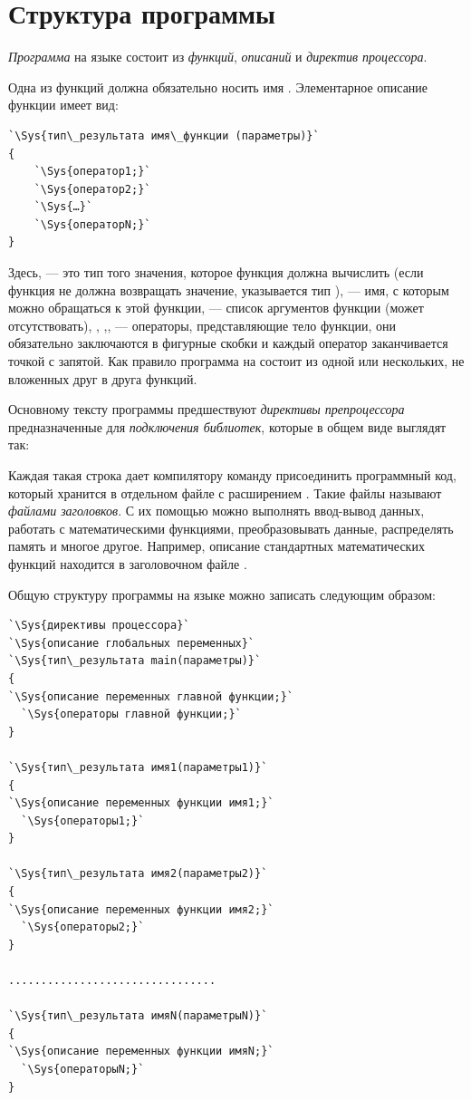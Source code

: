 \noindent{}

\section[Структура программы]{Структура программы}
\emph{Программа} на языке  состоит из
\emph{функций}, \emph{описаний} и \emph{директив процессора}. 

Одна из функций должна обязательно носить имя . Элементарное описание функции имеет вид:

\begin{lstlisting}
`\Sys{тип\_результата имя\_функции (параметры)}`
{
    `\Sys{оператор1;}`
    `\Sys{оператор2;}`
    `\Sys{…}`
    `\Sys{операторN;}`
}
\end{lstlisting}

Здесь,  --- это тип того значения, которое функция должна вычислить (если функция не
должна возвращать значение, указывается тип ),  --- имя, с которым
можно обращаться к этой функции,  --- список аргументов функции (может отсутствовать),
, ,,  --- операторы, представляющие
тело функции, они обязательно заключаются в фигурные скобки и каждый оператор заканчивается точкой с запятой. Как
правило программа на  состоит из одной или нескольких, не вложенных друг в друга функций.

Основному тексту программы предшествуют \emph{директивы препроцессора}
предназначенные для \emph{подключения библиотек}, которые в общем виде
выглядят так:


Каждая такая строка дает компилятору команду присоединить программный код, который хранится в отдельном файле с
расширением . Такие файлы называют \emph{файлами заголовков}. С их помощью можно
выполнять ввод-вывод данных, работать с математическими функциями, преобразовывать данные, распределять память и многое
другое. Например, описание стандартных математических функций находится в заголовочном файле .

Общую структуру программы на языке  можно записать следующим образом:
\begin{lstlisting}
`\Sys{директивы процессора}`
`\Sys{описание глобальных переменных}`
`\Sys{тип\_результата main(параметры)}`
{
`\Sys{описание переменных главной функции;}`
  `\Sys{операторы главной функции;}`
}

`\Sys{тип\_результата имя1(параметры1)}`
{
`\Sys{описание переменных функции имя1;}`
  `\Sys{операторы1;}`
}

`\Sys{тип\_результата имя2(параметры2)}`
{
`\Sys{описание переменных функции имя2;}`
  `\Sys{операторы2;}`
}

................................

`\Sys{тип\_результата имяN(параметрыN)}`
{
`\Sys{описание переменных функции имяN;}`
  `\Sys{операторыN;}`
}
\end{lstlisting}

